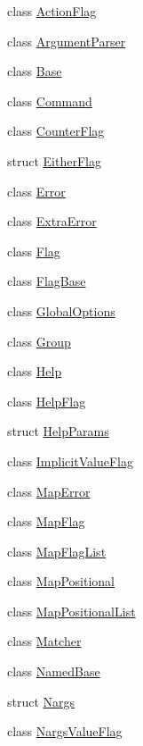\begin{DoxyCompactItemize}
\item 
class \hyperlink{classargs_1_1_action_flag}{Action\+Flag}
\item 
class \hyperlink{classargs_1_1_argument_parser}{Argument\+Parser}
\item 
class \hyperlink{classargs_1_1_base}{Base}
\item 
class \hyperlink{classargs_1_1_command}{Command}
\item 
class \hyperlink{classargs_1_1_counter_flag}{Counter\+Flag}
\item 
struct \hyperlink{structargs_1_1_either_flag}{Either\+Flag}
\item 
class \hyperlink{classargs_1_1_error}{Error}
\item 
class \hyperlink{classargs_1_1_extra_error}{Extra\+Error}
\item 
class \hyperlink{classargs_1_1_flag}{Flag}
\item 
class \hyperlink{classargs_1_1_flag_base}{Flag\+Base}
\item 
class \hyperlink{classargs_1_1_global_options}{Global\+Options}
\item 
class \hyperlink{classargs_1_1_group}{Group}
\item 
class \hyperlink{classargs_1_1_help}{Help}
\item 
class \hyperlink{classargs_1_1_help_flag}{Help\+Flag}
\item 
struct \hyperlink{structargs_1_1_help_params}{Help\+Params}
\item 
class \hyperlink{classargs_1_1_implicit_value_flag}{Implicit\+Value\+Flag}
\item 
class \hyperlink{classargs_1_1_map_error}{Map\+Error}
\item 
class \hyperlink{classargs_1_1_map_flag}{Map\+Flag}
\item 
class \hyperlink{classargs_1_1_map_flag_list}{Map\+Flag\+List}
\item 
class \hyperlink{classargs_1_1_map_positional}{Map\+Positional}
\item 
class \hyperlink{classargs_1_1_map_positional_list}{Map\+Positional\+List}
\item 
class \hyperlink{classargs_1_1_matcher}{Matcher}
\item 
class \hyperlink{classargs_1_1_named_base}{Named\+Base}
\item 
struct \hyperlink{structargs_1_1_nargs}{Nargs}
\item 
class \hyperlink{classargs_1_1_nargs_value_flag}{Nargs\+Value\+Flag}

\end{DoxyCompactItemize}
